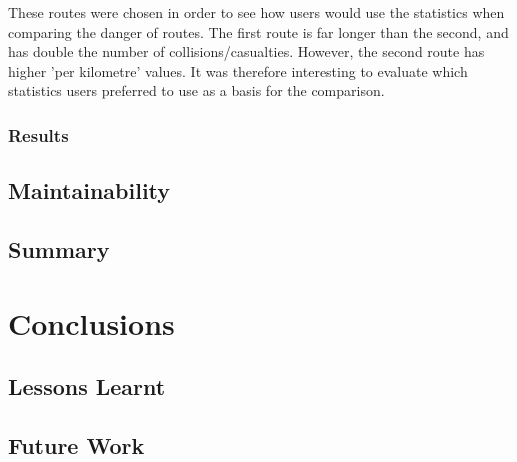 \documentclass[authoryearcitations]{UoYCSproject}
\begin{document}
These routes were chosen in order to see how users would use the statistics when comparing the danger of routes. The first route is far longer than the second, and has double the number of collisions/casualties. However, the second route has higher 'per kilometre' values. It was therefore interesting to evaluate which statistics users preferred to use as a basis for the comparison.

\subsection{Results}



\section{Maintainability}

\section{Summary}


\chapter{Conclusions}

\section{Lessons Learnt}

\section{Future Work}



\end{document}
